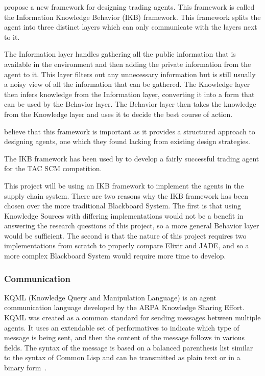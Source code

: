  propose a new framework for designing trading agents.
This framework is called the Information Knowledge Behavior (IKB) framework.
This framework splits the agent into three distinct layers which can only communicate with the layers next to it.

The Information layer handles gathering all the public information that is available in the environment and then adding the private information from the agent to it.
This layer filters out any unnecessary information but is still usually a noisy view of all the information that can be gathered.
The Knowledge layer then infers knowledge from the Information layer, converting it into a form that can be used by the Behavior layer.
The Behavior layer then takes the knowledge from the Knowledge layer and uses it to decide the best course of action.

 believe that this framework is important as it provides a structured approach to designing agents, one which they found lacking from existing design strategies.

The IKB framework has been used by  to develop a fairly successful trading agent for the TAC SCM competition.

This project will be using an IKB framework to implement the agents in the supply chain system.
There are two reasons why the IKB framework has been chosen over the more traditional Blackboard System.
The first is that using Knowledge Sources with differing implementations would not be a benefit in answering the research questions of this project, so a more general Behavior layer would be sufficient.
The second is that the nature of this project requires two implementations from scratch to properly compare Elixir and JADE, and so a more complex Blackboard System would require more time to develop.

\subsubsection{Communication}

KQML (Knowledge Query and Manipulation Language) is an agent communication language developed by the ARPA Knowledge Sharing Effort.
KQML was created as a common standard for sending messages between multiple agents.
It uses an extendable set of performatives to indicate which type of message is being sent, and then the content of the message follows in various fields.
The syntax of the message is based on a balanced parenthesis list similar to the syntax of Common Lisp and can be transmitted as plain text or in a binary form~\cite{finin1994kqml}.

